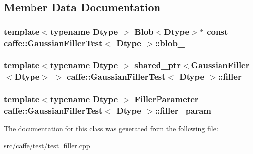 \subsection{Member Data Documentation}
\hypertarget{classcaffe_1_1_gaussian_filler_test_a2bf1c6d059d5a2ddd346582a6e8e5f75}{
\subsubsection[{blob\+\_\+}]{\setlength{\rightskip}{0pt plus 5cm}template$<$typename Dtype $>$ {\bf Blob}$<$Dtype$>$$\ast$ const {\bf caffe\+::\+Gaussian\+Filler\+Test}$<$ Dtype $>$\+::blob\+\_\+\hspace{0.3cm}{\ttfamily [protected]}}}\label{classcaffe_1_1_gaussian_filler_test_a2bf1c6d059d5a2ddd346582a6e8e5f75}
\hypertarget{classcaffe_1_1_gaussian_filler_test_a742c237b4c3e81179d080f4122f2e92e}{
\subsubsection[{filler\+\_\+}]{\setlength{\rightskip}{0pt plus 5cm}template$<$typename Dtype $>$ shared\+\_\+ptr$<${\bf Gaussian\+Filler}$<$Dtype$>$ $>$ {\bf caffe\+::\+Gaussian\+Filler\+Test}$<$ Dtype $>$\+::filler\+\_\+\hspace{0.3cm}{\ttfamily [protected]}}}\label{classcaffe_1_1_gaussian_filler_test_a742c237b4c3e81179d080f4122f2e92e}
\hypertarget{classcaffe_1_1_gaussian_filler_test_a9043c61c0efe496faf5e8ba603d79395}{
\subsubsection[{filler\+\_\+param\+\_\+}]{\setlength{\rightskip}{0pt plus 5cm}template$<$typename Dtype $>$ Filler\+Parameter {\bf caffe\+::\+Gaussian\+Filler\+Test}$<$ Dtype $>$\+::filler\+\_\+param\+\_\+\hspace{0.3cm}{\ttfamily [protected]}}}\label{classcaffe_1_1_gaussian_filler_test_a9043c61c0efe496faf5e8ba603d79395}


The documentation for this class was generated from the following file\+:\begin{DoxyCompactItemize}
\item 
src/caffe/test/\hyperlink{test__filler_8cpp}{test\+\_\+filler.\+cpp}\end{DoxyCompactItemize}
